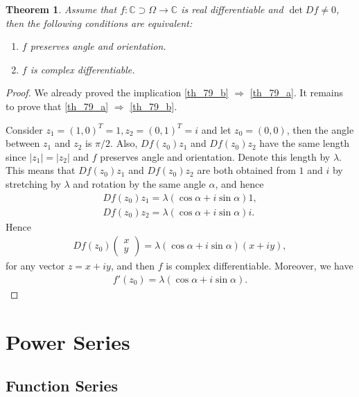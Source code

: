 \documentclass[11pt]{book}
\newtheorem{theorem}{Theorem}[chapter]
\theoremstyle{definition}
\numberwithin{equation}{chapter}
\begin{document}
\begin{theorem}
Assume that $f: \mathbb{C} \supset \Omega \to \mathbb{C}$ is real differentiable and $\det Df \neq 0$, then the following conditions are equivalent:
\begin{enumerate}[label=(\alph*)]
    \item $f$ preserves angle and orientation.\label{th_79_a}
    
    \item $f$ is complex differentiable. \label{th_79_b}
\end{enumerate}
\end{theorem}
\begin{proof}
We already proved the implication \ref{th_79_b} $\Rightarrow$ \ref{th_79_a}. It remains to prove that \ref{th_79_a} $\Rightarrow$ \ref{th_79_b}. 

Consider $z_1 = (1,0)^T = 1, z_2 = (0,1)^T = i$ and let $z_0 = (0,0)$, then the angle between $z_1$ and $z_2$ is $\pi/2$. Also, $Df(z_0) z_1$ and $Df(z_0) z_2$ have the same length since $\left|z_1\right| = \left|z_2\right|$ and $f$ preserves angle and orientation. Denote this length by $\lambda$. This means that $Df(z_0) z_1$ and $Df(z_0) z_2$ are both obtained from $1$ and $i$ by stretching by $\lambda$ and rotation by the same angle $\alpha$, and hence
\begin{align*}
    Df(z_0) z_1 = \lambda (\cos \alpha + i \sin \alpha) 1, \\
    Df(z_0) z_2 = \lambda (\cos \alpha + i \sin \alpha) i.
\end{align*}
Hence
\begin{align*}
    Df(z_0) \begin{pmatrix} x \\ y \end{pmatrix} = \lambda (\cos \alpha + i \sin \alpha) (x + iy),
\end{align*}
for any vector $z = x + iy$, and then $f$ is complex differentiable. Moreover, we have
\begin{align*}
    f'(z_0) = \lambda (\cos \alpha + i \sin \alpha).
\end{align*}
\end{proof}


\medskip

\chapter{Power Series}


\section{Function Series}
\end{document}
